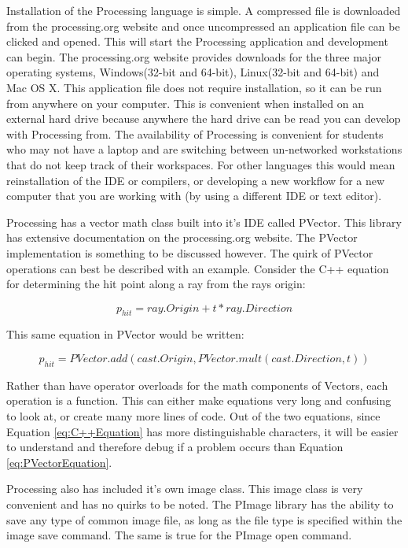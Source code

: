 Installation of the Processing language is simple.  A compressed file is downloaded from the processing.org website and once uncompressed an application file can be clicked and opened.  This will start the Processing application and development can begin.  The processing.org website provides downloads for the three major operating systems, Windows(32-bit and 64-bit), Linux(32-bit and 64-bit) and Mac OS X.  This application file does not require installation, so it can be run from anywhere on your computer.  This is convenient when installed on an external hard drive because anywhere the hard drive can be read you can develop with Processing from.  The availability of Processing is convenient for students who may not have a laptop and are switching between un-networked workstations that do not keep track of their workspaces. For other languages this would mean reinstallation of the IDE or compilers, or developing a new workflow for a new computer that you are working with (by using a different IDE or text editor).

Processing has a vector math class built into it's IDE called PVector.  This library has extensive documentation on the processing.org website.  The PVector implementation is something to be discussed however.  The quirk of PVector operations can best be described with an example.  Consider the C++ equation for determining the hit point along a ray from the rays origin:

\begin{equation}
\label{eq:C++Equation}
p_{hit} = ray.Origin + t*ray.Direction
\end{equation}

This same equation in PVector would be written:

\begin{equation}
\label{eq:PVectorEquation}
p_{hit} = PVector.add(cast.Origin, PVector.mult(cast.Direction,t))
\end{equation}

Rather than have operator overloads for the math components of Vectors, each operation is a function.  This can either make equations very long and confusing to look at, or create many more lines of code.  Out of the two equations, since Equation \ref{eq:C++Equation} has more distinguishable characters, it will be easier to understand and therefore debug if a problem occurs than Equation \ref{eq:PVectorEquation}.

Processing also has included it's own image class.  This image class is very convenient and has no quirks to be noted.  The PImage library has the ability to save any type of common image file, as long as the file type is specified within the image save command.  The same is true for the PImage open command.

